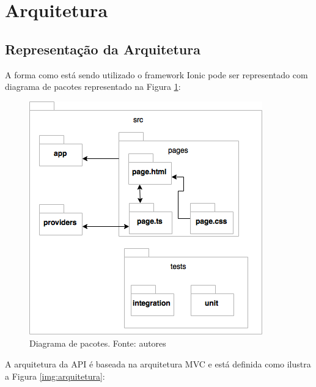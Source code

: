 \section{Arquitetura}

\subsection{Representação da Arquitetura}

A forma como está sendo utilizado o framework Ionic pode ser representado com diagrama de pacotes representado na Figura \ref{img:pacotes}:

\begin{figure}[H]
    \centering
    \includegraphics[scale=0.5]{figuras/ionic_arch.png}
    \caption[Diagrama de pacotes do aplicativo]{Diagrama de pacotes. Fonte: autores}
    \label{img:pacotes}
\end{figure}

A arquitetura da API é baseada na arquitetura MVC e está definida como ilustra a Figura \ref{img:arquitetura}:

